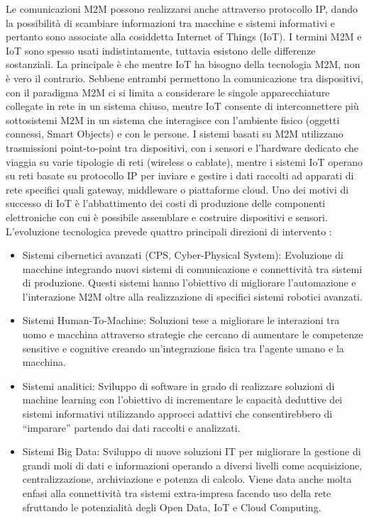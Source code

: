 \documentclass[12pt,a4paper,openright,twoside]{report}
\begin{document}
Le comunicazioni M2M possono realizzarsi anche attraverso protocollo IP, dando la possibilit\`a di scambiare informazioni tra macchine e sistemi informativi e pertanto sono associate alla cosiddetta Internet of Things (IoT).
I termini M2M e IoT sono spesso usati indistintamente, tuttavia esistono delle differenze sostanziali. La principale \`e che mentre IoT ha bisogno della tecnologia M2M, non \`e vero il contrario. Sebbene entrambi permettono la comunicazione tra dispositivi, con il paradigma M2M ci si limita a considerare le singole apparecchiature collegate in rete in un sistema chiuso, mentre IoT consente di interconnettere pi\`u sottosistemi M2M in un sistema che interagisce con l'ambiente fisico (oggetti connessi, Smart Objects) e con le persone.
I sistemi basati su M2M utilizzano trasmissioni point-to-point tra dispositivi, con i sensori e l'hardware dedicato che viaggia su varie tipologie di reti (wireless o cablate), mentre i sistemi IoT operano su reti basate su protocollo IP per inviare e gestire i dati raccolti ad apparati di rete specifici quali gateway, middleware o piattaforme cloud.
Uno dei motivi di successo di IoT \`e l'abbattimento dei costi di produzione delle componenti elettroniche con cui \`e possibile assemblare e costruire dispositivi e sensori. L'evoluzione tecnologica prevede quattro principali direzioni di intervento \cite{K27} :
\begin{itemize}                       
\item Sistemi cibernetici avanzati (CPS, Cyber-Physical System): Evoluzione di macchine integrando nuovi sistemi di comunicazione e connettivit\`a tra sistemi di produzione. Questi sistemi hanno l'obiettivo di migliorare l'automazione e l'interazione M2M oltre alla realizzazione di specifici sistemi robotici avanzati.
\item Sistemi Human-To-Machine: Soluzioni tese a migliorare le interazioni tra uomo e macchina attraverso strategie che cercano di aumentare le competenze sensitive e cognitive creando un'integrazione fisica tra l'agente umano e la macchina.
\item Sistemi analitici: Sviluppo di software in grado di realizzare soluzioni di machine learning con l'obiettivo di incrementare le capacit\`a deduttive dei sistemi informativi utilizzando approcci adattivi che consentirebbero di ``imparare'' partendo dai dati raccolti e analizzati.
\item Sistemi Big Data: Sviluppo di nuove soluzioni IT per migliorare la gestione di grandi moli di dati e informazioni operando a diversi livelli come acquisizione, centralizzazione, archiviazione e potenza di calcolo. Viene data anche molta enfasi alla connettivit\`a tra sistemi extra-impresa facendo uso della rete sfruttando le potenzialit\`a degli Open Data, IoT e Cloud Computing.
\end{itemize}
\end{document}
